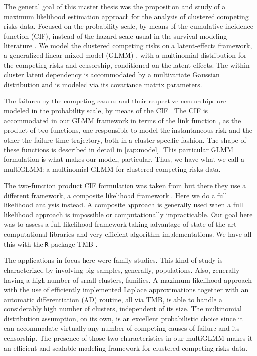 The general goal of this master thesis was the proposition and study of
a maximum likelihood estimation approach for the analysis of clustered
competing risks data. Focused on the probability scale, by means of the
cumulative incidence function (CIF), instead of the hazard scale usual
in the survival modeling literature \cite{kalb&prentice}. We model the
clustered competing risks on a latent-effects framework, a generalized
linear mixed model (GLMM) \cite{GLMM}, with a multinomial distribution
for the competing risks and censorship, conditioned on the
latent-effects. The within-cluster latent dependency is accommodated by
a multivariate Gaussian distribution and is modeled via its covariance
matrix parameters.

The failures by the competing causes and their respective censorships
are modeled in the probability scale, by means of the CIF
\cite{kalb&prentice, andersen12}. The CIF is accommodated in our GLMM
framework in terms of the link function \cite{GLM89}, as the product of
two functions, one responsible to model the instantaneous risk and the
other the failure time trajectory, both in a cluster-specific
fashion. The shape of these functions is described in detail
in \autoref{cap:model}. This particular GLMM formulation is what makes
our model, particular. Thus, we have what we call a multiGLMM: a
multinomial GLMM for clustered competing risks data.

The two-function product CIF formulation was taken from
 but there they use a different framework, a
composite likelihood framework \cite{lindsay88, cox&reid04, varin11}.
Here we do a full likelihood analysis instead. A composite approach is
generally used when a full likelihood approach is impossible or
computationally impracticable. Our goal here was to assess a full
likelihood framework taking advantage of state-of-the-art computational
libraries and very efficient algorithm implementations. We have all this
with the \texttt{R} \cite{R21} package TMB \cite{TMB}.

The applications in focus here were family studies. This kind of study
is characterized by involving big samples, generally, populations. Also,
generally having a high number of small clusters, families. A maximum
likelihood approach with the use of efficiently implemented Laplace
approximations \cite{tierney,patrao} together with an automatic
differentiation (AD) \cite{corestats,nocedal&wright} routine, all via
TMB, is able to handle a considerably high number of clusters,
independent of its size. The multinomial distribution assumption, on its
own, is an excellent probabilistic choice since it can accommodate
virtually any number of competing causes of failure and its
censorship. The presence of those two characteristics in our multiGLMM
makes it an efficient and scalable modeling framework for clustered
competing risks data.

